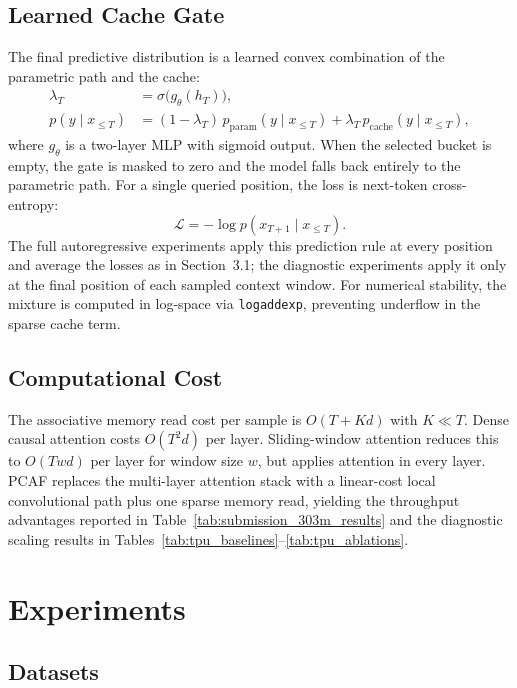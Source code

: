 \documentclass[11pt]{article}
\begin{document}
\subsection{Learned Cache Gate}

The final predictive distribution is a learned convex combination of the
parametric path and the cache:
\begin{align}
  \lambda_T &= \sigma\bigl(g_{\theta}(h_T)\bigr), \\
  p(y \mid x_{\leq T}) &=
  (1 - \lambda_T)\,p_{\mathrm{param}}(y \mid x_{\leq T})
  + \lambda_T\,p_{\mathrm{cache}}(y \mid x_{\leq T}),
  \label{eq:mixture}
\end{align}
where $g_\theta$ is a two-layer MLP with sigmoid output. When the selected
bucket is empty, the gate is masked to zero and the model falls back entirely
to the parametric path. For a single queried position, the loss is next-token
cross-entropy:
\begin{equation}
  \mathcal{L} = -\log p(x_{T+1} \mid x_{\leq T}).
\end{equation}
The full autoregressive experiments apply this prediction rule at every
position and average the losses as in Section~3.1; the diagnostic experiments
apply it only at the final position of each sampled context window.
For numerical stability, the mixture is computed in log-space via
\texttt{logaddexp}, preventing underflow in the sparse cache term.

\subsection{Computational Cost}

The associative memory read cost per sample is $O(T + Kd)$ with $K \ll T$.
Dense causal attention costs $O(T^2 d)$ per layer. Sliding-window attention
reduces this to $O(Twd)$ per layer for window size $w$, but applies attention
in every layer. PCAF replaces the multi-layer attention stack with a
linear-cost local convolutional path plus one sparse memory read, yielding the throughput
advantages reported in Table~\ref{tab:submission_303m_results} and the
diagnostic scaling results in Tables~\ref{tab:tpu_baselines}--\ref{tab:tpu_ablations}.

\section{Experiments}

\subsection{Datasets}
\end{document}
